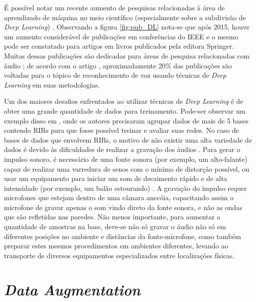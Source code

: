 É possível notar um recente aumento de pesquisas relacionadas à área de aprendizado de máquina no meio científico (especialmente sobre a subdivisão de 
\textit{Deep Learning}) \cite{Study_SR_DL}. Observando a figura \ref{fig:pub_DL} \cite{Jounal_Awareness_DL} nota-se que após 2015, houve um aumento 
considerável de publicações em conferências do IEEE e o mesmo pode ser constatado para artigos em livros publicados pela editora Springer\textregistered.
Muitas dessas publicações são dedicadas para áreas de pesquisa relacionadas com áudio \cite{Study_SR_DL, Speech_proc_plus_DL, Source_Sep_DL}; de acordo com o artigo \cite{Survey_DL}, aproximadamente 20\% 
das publicações são voltadas para o tópico de reconhecimento de voz usando técnicas de \textit{Deep Learning} em suas metodologias.

Um dos maiores desafios enfrentados ao utilizar técnicas de \textit{Deep Learning} é de obter uma grande quantidade de dados para treinamento.
Pode-ser observar um exemplo disso em \cite{Estimation_RT_DRR,ACE_Data_Aug_Eval}, onde os autores precisaram agrupar dados de mais de 5 bases contendo
RIRs para que fosse possível treinar e avaliar suas redes.
No caso de bases de dados que envolvem RIRs, o motivo de não existir uma alta variedade de dados é devido às dificuldades
de realizar a gravação dos áudios \cite{Recording_RIR_2}.
Para gerar o impulso sonoro, é necessário de uma fonte sonora (por exemplo, um alto-falante) capaz de realizar uma varredura de senos com o mínimo de distorção
possível, ou usar um equipamento para iniciar um som de decaimento rápido e de alta intensidade (por exemplo, um balão estourando) \cite{Recording_RIR}.
A gravação do impulso requer microfones que estejam dentro de uma câmara anecóia, capacitando assim o microfone de gravar apenas o som vindo direto
da fonte sonora, e não as ondas que são refletidas nas paredes.
Não menos importante, para aumentar a quantidade de amostras na base, deve-se não só gravar o áudio não só em diferentes posições no ambiente
e distâncias da fonte-microfone, como também preparar estes mesmos procedimentos em ambientes diferentes, levando ao transporte de diversos equipamentos
especializados entre localizações físicas.

\section{\textit{Data Augmentation}}


